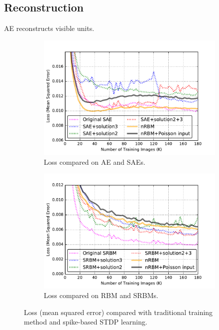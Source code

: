 \subsection{Reconstruction}
AE reconstructs visible units.
\begin{figure}
	\centering
	\begin{subfigure}[t]{0.45\textwidth}
		\includegraphics[width=\textwidth]{pics_sdlm/53_MNIST_SRBM_all/compare_recon.pdf}
		\caption{Loss compared on AE and SAEs.}
	\end{subfigure}
	\begin{subfigure}[t]{0.45\textwidth}
		\includegraphics[width=\textwidth]{pics_sdlm/53_MNIST_SRBM_all/compare_recon_rbm.pdf}
		\caption{Loss compared on RBM and SRBMs.}
	\end{subfigure}
	\caption{Loss (mean squared error) compared with traditional training method and spike-based STDP learning.}
\end{figure}


